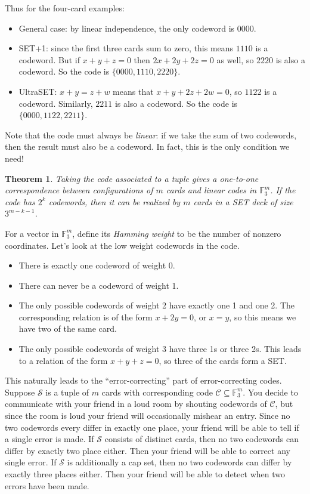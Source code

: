 \documentclass{article}
\newtheorem{thm}{Theorem}
\theoremstyle{definition}
\theoremstyle{remark}
\begin{document}
Thus for the four-card examples:
\begin{itemize}
    \item General case: by linear independence, the only codeword is $0000$.
    \item SET+1: since the first three cards sum to zero, this means $1110$ is a codeword. But if $x+y+z=0$ then $2x+2y+2z=0$ as well, so $2220$ is also a codeword. So the code is $\{0000,1110,2220\}$.
    \item UltraSET: $x+y=z+w$ means that $x+y+2z+2w=0$, so $1122$ is a codeword. Similarly, $2211$ is also a codeword. So the code is $\{0000,1122,2211\}$.
\end{itemize}

Note that the code must always be \emph{linear}: if we take the sum of two codewords, then the result must also be a codeword. In fact, this is the only condition we need!

\begin{thm}
    Taking the code associated to a tuple gives a one-to-one correspondence between configurations of $m$ cards and linear codes in $\mathbb F_3^m$. If the code has $2^k$ codewords, then it can be realized by $m$ cards in a SET deck of size $3^{m-k-1}$.
\end{thm}

For a vector in $\mathbb F_3^m$, define its \emph{Hamming weight} to be the number of nonzero coordinates. Let's look at the low weight codewords in the code.
\begin{itemize}
    \item There is exactly one codeword of weight 0.
    \item There can never be a codeword of weight 1.
    \item The only possible codewords of weight 2 have exactly one 1 and one 2. The corresponding relation is of the form $x+2y=0$, or $x=y$, so this means we have two of the same card.
    \item The only possible codewords of weight 3 have three 1s or three 2s. This leads to a relation of the form $x+y+z=0$, so three of the cards form a SET.
\end{itemize}

This naturally leads to the ``error-correcting'' part of error-correcting codes. Suppose $\mathcal S$ is a tuple of $m$ cards with corresponding code $\mathcal C\subseteq\mathbb F_3^m$. You decide to communicate with your friend in a loud room by shouting codewords of $\mathcal C$, but since the room is loud your friend will occasionally mishear an entry. Since no two codewords every differ in exactly one place, your friend will be able to tell if a single error is made. If $\mathcal S$ consists of distinct cards, then no two codewords can differ by exactly two place either. Then your friend will be able to correct any single error. If $\mathcal S$ is additionally a cap set, then no two codewords can differ by exactly three places either. Then your friend will be able to detect when two errors have been made.
\end{document}
